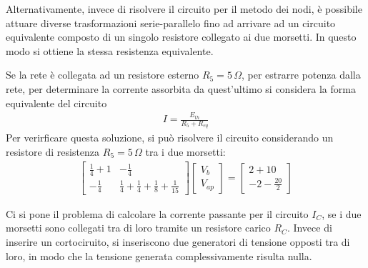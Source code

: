 \documentclass{article}
\numberwithin{equation}{subsection}
\begin{document}
Alternativamente, invece di risolvere il circuito per il metodo dei nodi, è possibile attuare diverse trasformazioni serie-parallelo fino ad arrivare ad un circuito 
equivalente composto di un singolo resistore collegato ai due morsetti. In questo modo si ottiene la stessa resistenza equivalente.  

Se la rete è collegata ad un resistore esterno $R_5=5\,\Omega$, per estrarre potenza dalla rete, per determinare la corrente assorbita da quest'ultimo si considera la forma equivalente 
del circuito
\begin{gather*}
    I=\displaystyle\frac{E_{th}}{R_5+R_{eq}}
\end{gather*}
Per verirficare questa soluzione, si può risolvere il circuito considerando un resistore di resistenza $R_5=5\,\Omega$ tra i due morsetti:
\begin{gather*}
    \begin{bmatrix}
        \displaystyle\frac{1}{4}+1&-\displaystyle\frac{1}{4}\\
        \displaystyle-\frac{1}{4}&\displaystyle\frac{1}{4}+\frac{1}{4}+\frac{1}{8}+\frac{1}{15}
    \end{bmatrix}\begin{bmatrix}
        V_b\\
        V_{ap}
    \end{bmatrix}=\begin{bmatrix}
        2+10\\
        -2-\displaystyle\frac{20}{2}
    \end{bmatrix}
\end{gather*}


Ci si pone il problema di calcolare la corrente passante per il circuito $I_C$, se i due morsetti sono collegati tra di loro tramite un resistore carico $R_C$. Invece di 
inserire un cortociruito, si inseriscono due generatori di tensione opposti tra di loro, in modo che la tensione generata complessivamente risulta nulla. 
\end{document}
